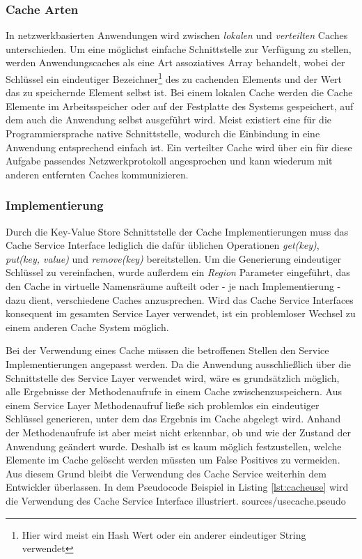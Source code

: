 \subsubsection{Cache Arten}
In netzwerkbasierten Anwendungen wird zwischen \emph{lokalen} und
\emph{verteilten} Caches unterschieden. Um eine möglichst einfache Schnittstelle
zur Verfügung zu stellen, werden Anwendungscaches als eine Art assoziatives
Array behandelt, wobei der Schlüssel ein eindeutiger Bezeichner\footnote{Hier
wird meist ein Hash Wert oder ein anderer eindeutiger String verwendet} des zu cachenden Elements und
der Wert das zu speichernde Element selbst ist. Bei einem lokalen Cache werden
die Cache Elemente im Arbeitsspeicher oder auf der Festplatte des Systems
gespeichert, auf dem auch die Anwendung selbst ausgeführt wird. Meist
existiert eine für die Programmiersprache native Schnittstelle, wodurch die
Einbindung in eine Anwendung entsprechend einfach ist. Ein verteilter Cache wird
über ein für diese Aufgabe passendes Netzwerkprotokoll angesprochen und kann
wiederum mit anderen entfernten Caches kommunizieren.

\subsubsection{Implementierung}
Durch die Key-Value Store Schnittstelle der Cache Implementierungen muss das
Cache Service Interface lediglich die dafür üblichen Operationen \emph{get(key)},
\emph{put(key, value)} und \emph{remove(key)}
bereitstellen. Um die Generierung eindeutiger Schlüssel zu vereinfachen, wurde
außerdem ein \emph{Region} Parameter eingeführt, das den Cache in virtuelle
Namensräume aufteilt oder - je nach Implementierung - dazu dient, verschiedene
Caches anzusprechen. Wird das Cache Service Interfaces konsequent im gesamten
Service Layer verwendet, ist ein problemloser Wechsel zu einem anderen Cache
System möglich.

Bei der Verwendung eines Cache müssen die betroffenen Stellen den Service
Implementierungen angepasst werden. Da die Anwendung ausschließlich über die
Schnittstelle des Service Layer verwendet wird, wäre es grundsätzlich möglich,
alle Ergebnisse der Methodenaufrufe in einem Cache zwischenzuspeichern. Aus einem
Service Layer Methodenaufruf ließe sich problemlos ein eindeutiger Schlüssel
generieren, unter dem das Ergebnis im Cache abgelegt wird. Anhand der
Methodenaufrufe ist aber meist nicht erkennbar, ob und wie der Zustand der
Anwendung geändert wurde. Deshalb ist es kaum möglich festzustellen, welche
Elemente im Cache gelöscht werden müssten um False Positives zu vermeiden. Aus
diesem Grund bleibt die Verwendung des Cache Service weiterhin dem Entwickler
überlassen. In dem Pseudocode Beispiel in Listing \ref{lst:cacheuse} wird die
Verwendung des Cache Service Interface illustriert.
\pagebreak
\lstset{language=Pascal}
 {sources/usecache.pseudo}

